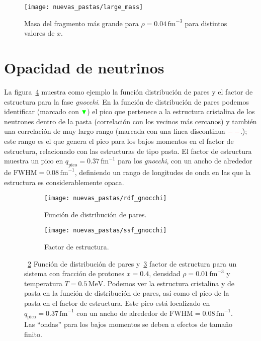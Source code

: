 \begin{figure}
  \centering
  \texttt{[image: nuevas\_pastas/large\_mass]}
  \caption{Masa del fragmento más grande para $\rho = 0.04\,\text{fm}^{-3}$ para distintos valores de $x$.}
  \label{fig:large_mass}
\end{figure}

\section{Opacidad de neutrinos}\label{sc:opacity}

La figura~\ref{fig:gr_sq_gnocchi} muestra como ejemplo la función distribución de pares y el factor de estructura para la fase \emph{gnocchi}.
En la función de distribución de pares podemos identificar (marcado con $\color{green} \blacktriangledown$) el pico que pertenece a la estructura cristalina de los neutrones dentro de la pasta (correlación con los vecinos más cercanos) y también una correlación de muy largo rango (marcada con una línea discontinua $\color{red}-\,-$.);
este rango es el que genera el pico para los bajos momentos en el factor de estructura, relacionado con las estructuras de tipo pasta.
El factor de estructura muestra un pico en $q_\text{pico} = 0.37\,\text{fm}^{-1}$ para los \emph{gnocchi}, con un ancho de alrededor de $\text{FWHM} = 0.08\,\text{fm}^{-1}$, definiendo un rango de longitudes de onda en las que la estructura es considerablemente opaca.

\begin{figure}  \centering
  \begin{subfigure}[h!]{0.4\columnwidth}
    \centering
    \texttt{[image: nuevas\_pastas/rdf\_gnocchi]}
    \caption{Función de distribución de pares.}
      \label{sfig:gr_gnocchi}
  \end{subfigure}
  \begin{subfigure}[h!]{0.4\columnwidth}
    \centering
    \texttt{[image: nuevas\_pastas/ssf\_gnocchi]}
    \caption{Factor de estructura.}
      \label{sfig:ssf_gnocchi}
  \end{subfigure}
  \caption{~\ref{sfig:gr_gnocchi} Función de distribución de pares y~\ref{sfig:ssf_gnocchi} factor de estructura para un sistema con fracción de protones $x=0.4$, densidad $\rho=0.01\,\text{fm}^{-3}$ y temperatura $T=0.5\,\text{MeV}$.
    Podemos ver la estructura cristalina y de pasta en la función de distribución de pares, así como el pico de la pasta en el factor de estructura.
    Este pico está localizado en $q_\text{pico} = 0.37\,\text{fm}^{-1}$ con un ancho de alrededor de $\text{FWHM} = 0.08\,\text{fm}^{-1}$.
    Las ``ondas'' para los bajos momentos se deben a efectos de tamaño finito.}
  \label{fig:gr_sq_gnocchi}
\end{figure}



